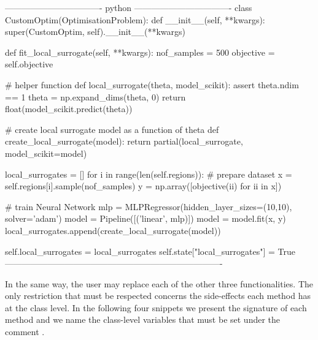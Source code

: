 \begin{Code}
---------------------------------- python ----------------------------------
class CustomOptim(OptimisationProblem):
    def __init__(self, **kwargs):
        super(CustomOptim, self).__init__(**kwargs)

    def fit_local_surrogate(self, **kwargs):
        nof_samples = 500
        objective = self.objective

        # helper function
        def local_surrogate(theta, model_scikit):
            assert theta.ndim == 1
            theta = np.expand_dims(theta, 0)
            return float(model_scikit.predict(theta))

        # create local surrogate model as a function of theta
        def create_local_surrogate(model):
            return partial(local_surrogate, model_scikit=model)

        local_surrogates = []
        for i in range(len(self.regions)):
            # prepare dataset
            x = self.regions[i].sample(nof_samples)
            y = np.array([objective(ii) for ii in x])

            # train Neural Network
            mlp = MLPRegressor(hidden_layer_sizes=(10,10), solver='adam')
            model = Pipeline([('linear', mlp)])
            model = model.fit(x, y)
            local_surrogates.append(create_local_surrogate(model))

        self.local_surrogates = local_surrogates
        self.state["local_surrogates"] = True
----------------------------------------------------------------------------
\end{Code}

In the same way, the user may replace each of the other three
functionalities. The only restriction that must be respected concerns
the side-effects each method has at the 
class level. In the following four snippets we present the signature
of each method and we name the class-level variables that must be set
under the comment .


